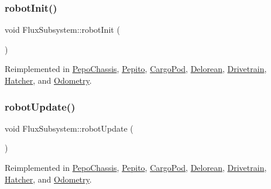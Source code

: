 \mbox{\label{classFluxSubsystem_aacd5ddfcadda0866d5e838de09a60d63}} 
\subsubsection{\texorpdfstring{robot\+Init()}{robotInit()}}
{\footnotesize\ttfamily void Flux\+Subsystem\+::robot\+Init (\begin{DoxyParamCaption}{ }\end{DoxyParamCaption})\hspace{0.3cm}{\ttfamily [virtual]}}



Reimplemented in \hyperlink{classPepoChassis_a18dd25fff35cf7ccac6b710e329873e6}{Pepo\+Chassis}, \hyperlink{classPepito_a1eed9bef768f3694d8bdfb4f610b8e3a}{Pepito}, \hyperlink{classCargoPod_a28aaa86f3e7ee713748f4e9b1a136fd8}{Cargo\+Pod}, \hyperlink{classDelorean_a591e1b68a21a82c7e1cf4e7dbf5294a2}{Delorean}, \hyperlink{classDrivetrain_a7e9c10a27b3cc5ad89f2338de39b7c62}{Drivetrain}, \hyperlink{classHatcher_ae917b572274b45c8e695cd8e285a5d70}{Hatcher}, and \hyperlink{classOdometry_a84379c5878ad6dd502297e6f956298f9}{Odometry}.

\mbox{\label{classFluxSubsystem_ac2b1c08b53251870e945edf7080c1549}} 
\subsubsection{\texorpdfstring{robot\+Update()}{robotUpdate()}}
{\footnotesize\ttfamily void Flux\+Subsystem\+::robot\+Update (\begin{DoxyParamCaption}{ }\end{DoxyParamCaption})\hspace{0.3cm}{\ttfamily [virtual]}}



Reimplemented in \hyperlink{classPepoChassis_acd6fa29da41ac5108af7e3a1f15218aa}{Pepo\+Chassis}, \hyperlink{classPepito_a0894a64d02550bb35b4e3eefa3ac4934}{Pepito}, \hyperlink{classCargoPod_a22723a1f9685242aca13e6bc44e3f0a2}{Cargo\+Pod}, \hyperlink{classDelorean_a47b9cfdb59a6f46ee26f45f794e313c1}{Delorean}, \hyperlink{classDrivetrain_a2a2b5976426dc0c1f45438fd7a5926e4}{Drivetrain}, \hyperlink{classHatcher_aacf85f8cc9f1c523ef7c4cd91808201e}{Hatcher}, and \hyperlink{classOdometry_a4c82fa784546795d6b0bf32c1b919202}{Odometry}.

